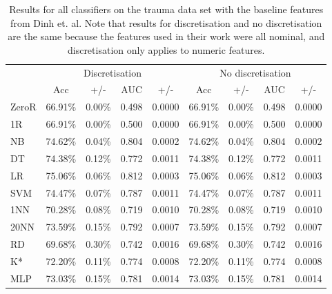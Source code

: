 \begin{table}[htbp]
\caption{Results for all classifiers on the trauma data set with the baseline features from Dinh et. al. Note that results for discretisation and no discretisation are the same because the features used in their work were all nominal, and discretisation only applies to numeric features.}
\begin{tabular}{|l|cccc|cccc|}
\hline
 & \multicolumn{ 4}{c|}{Discretisation} & \multicolumn{ 4}{c|}{No discretisation} \\
  & Acc & +/- & AUC & +/- & Acc & +/- & AUC & +/- \\ \hline
  ZeroR & 66.91\% & 0.00\% & 0.498 & 0.0000 & 66.91\% & 0.00\% & 0.498 & 0.0000 \\ 
  1R & 66.91\% & 0.00\% & 0.500 & 0.0000 & 66.91\% & 0.00\% & 0.500 & 0.0000 \\ 
  NB & 74.62\% & 0.04\% & 0.804 & 0.0002 & 74.62\% & 0.04\% & 0.804 & 0.0002 \\ 
  DT & 74.38\% & 0.12\% & 0.772 & 0.0011 & 74.38\% & 0.12\% & 0.772 & 0.0011 \\ 
  LR & 75.06\% & 0.06\% & 0.812 & 0.0003 & 75.06\% & 0.06\% & 0.812 & 0.0003 \\ 
  SVM & 74.47\% & 0.07\% & 0.787 & 0.0011 & 74.47\% & 0.07\% & 0.787 & 0.0011 \\ 
  1NN & 70.28\% & 0.08\% & 0.719 & 0.0010 & 70.28\% & 0.08\% & 0.719 & 0.0010 \\ 
  20NN & 73.59\% & 0.15\% & 0.792 & 0.0007 & 73.59\% & 0.15\% & 0.792 & 0.0007 \\ 
  RD & 69.68\% & 0.30\% & 0.742 & 0.0016 & 69.68\% & 0.30\% & 0.742 & 0.0016 \\ 
  K* & 72.20\% & 0.11\% & 0.774 & 0.0008 & 72.20\% & 0.11\% & 0.774 & 0.0008 \\ 
  MLP & 73.03\% & 0.15\% & 0.781 & 0.0014 & 73.03\% & 0.15\% & 0.781 & 0.0014 \\ \hline
\end{tabular}
\label{}
\end{table}
